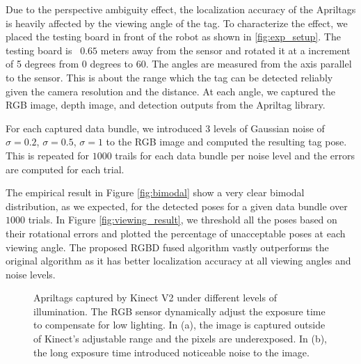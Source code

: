 Due to the perspective ambiguity effect, the localization accuracy of the Apriltags is heavily affected by the viewing angle of the tag. To characterize the effect, we placed the testing board in front of the robot as shown in \ref{fig:exp_setup}. The testing board is ~$0.65$ meters away from the sensor and rotated it at a increment of 5 degrees from 0 degrees to 60. The angles are measured from the axis parallel to the sensor. This is about the range which the tag can be detected reliably given the camera resolution and the distance. At each angle, we captured the RGB image, depth image, and detection outputs from the Apriltag library. 

For each captured data bundle, we introduced 3 levels of Gaussian noise of $\sigma = 0.2$, $\sigma = 0.5$, $\sigma = 1$  to the RGB image and computed the resulting tag pose. This is repeated for $1000$ trails for each data bundle per noise level and the errors are computed for each trial.  

The empirical result in Figure \ref{fig:bimodal} show a very clear bimodal distribution, as we expected, for the detected poses for a given data bundle over $1000$ trials. In Figure \ref{fig:viewing_result}, we threshold all the poses based on their rotational errors and plotted the percentage of unacceptable poses at each viewing angle. The proposed RGBD fused algorithm vastly outperforms the original algorithm as it has better localization accuracy at all viewing angles and noise levels. 

\begin{figure}
\centering
{}
\caption{Apriltags captured by Kinect V2 under different levels of illumination. The RGB sensor dynamically adjust the exposure time to compensate for low lighting. In (a), the image is captured outside of Kinect's adjustable range and the pixels are underexposed. In (b), the long exposure time introduced noticeable noise to the image. }
\label{fig:illumination_tag}
\end{figure}

